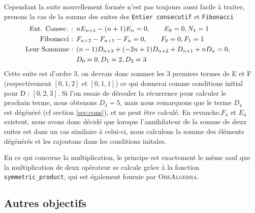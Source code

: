 \documentclass[12pt]{article}
\begin{document}
        \par Cependant la suite nouvellement formée n'est pas toujours aussi facile à traiter, prenons la cas
        de la somme des suites des  \texttt{Entier consecutif} et \texttt{Fibonacci}
        \begin{align*}
            \textnormal{Ent. Consec. : } &nE_{n+1} - (n+1)E_n = 0,\qquad E_0 = 0, N_1 = 1\\
            \textnormal{Fibonacci : } &F_{n+2} - F_{n+1} - F_n = 0,\qquad F_0=0, F_1=1\\
            \textnormal{Leur Sommme : } &(n - 1)D_{n+3} + (-2n + 1)D_{n+2} + D_{n+1} + nD_n = 0, \\
            &D_0 = 0, D_1 = 2, D_2 = 3\\
        \end{align*} 
        Cette suite est d'ordre 3, on devrais donc sommer les 3 premiers termes de E et F (respectivement 
        $[0,1,2]$ et $[0,1,1]$) ce qui donnerai comme conditions initial pour D : $[0,2,3]$.
        Si 
        l'on essaie de dérouler la récurrence pour calculer le prochain terme, nous obtenons $D_3 = 5$,
        mais nous remarquons que le terme $D_4$ est dégénéré (cf section \ref{sec:cons}), et ne peut 
        être calculé. En revanche,$F_4$ et $E_4$ existent, nous avons donc décidé que lorsque l'annihilateur
        de la somme de deux suites est dans un cas similaire à celui-ci, nous calculons la somme des
        éléments dégénérés et les rajoutons dans les conditions initales.
        \par En ce qui concerne la multiplication, le principe est exactement le même sauf que la 
        multiplication de deux opérateur se calcule grâce à la fonction \texttt{symmetric\_product},
        qui est également fournie par \textsc{OreAlgebra}.

    \subsection{Autres objectifs}

\setcounter{secnumdepth}{0}
\end{document}

